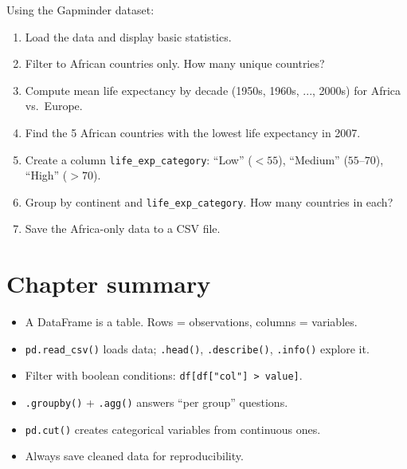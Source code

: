 \begin{exercise}
Using the Gapminder dataset:
\begin{enumerate}
  \item Load the data and display basic statistics.
  \item Filter to African countries only. How many unique countries?
  \item Compute mean life expectancy by decade (1950s, 1960s, ..., 2000s) for Africa vs.\ Europe.
  \item Find the 5 African countries with the lowest life expectancy in 2007.
  \item Create a column \texttt{life\_exp\_category}: ``Low'' ($<55$), ``Medium'' ($55$--$70$), ``High'' ($>70$).
  \item Group by continent and \texttt{life\_exp\_category}. How many countries in each?
  \item Save the Africa-only data to a CSV file.
\end{enumerate}
\end{exercise}

\section{Chapter summary}

\begin{itemize}
  \item A DataFrame is a table. Rows = observations, columns = variables.
  \item \texttt{pd.read\_csv()} loads data; \texttt{.head()}, \texttt{.describe()}, \texttt{.info()} explore it.
  \item Filter with boolean conditions: \texttt{df[df["col"] > value]}.
  \item \texttt{.groupby()} + \texttt{.agg()} answers ``per group'' questions.
  \item \texttt{pd.cut()} creates categorical variables from continuous ones.
  \item Always save cleaned data for reproducibility.
\end{itemize}

